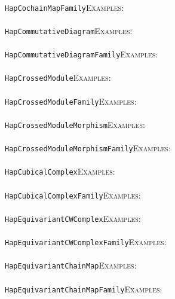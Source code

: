 \documentclass[a4paper,11pt]{report}
\begin{document}
{{ \\
 \texttt{HapCochainMapFamily}{\nobreakspace}{\nobreakspace}{\nobreakspace}{\nobreakspace}\textsc{Examples:} \\
 \\
 \texttt{HapCommutativeDiagram}{\nobreakspace}{\nobreakspace}{\nobreakspace}{\nobreakspace}\textsc{Examples:} \\
 \\
 \texttt{HapCommutativeDiagramFamily}{\nobreakspace}{\nobreakspace}{\nobreakspace}{\nobreakspace}\textsc{Examples:} \\
 \\
 \texttt{HapCrossedModule}{\nobreakspace}{\nobreakspace}{\nobreakspace}{\nobreakspace}\textsc{Examples:} \\
 \\
 \texttt{HapCrossedModuleFamily}{\nobreakspace}{\nobreakspace}{\nobreakspace}{\nobreakspace}\textsc{Examples:} \\
 \\
 \texttt{HapCrossedModuleMorphism}{\nobreakspace}{\nobreakspace}{\nobreakspace}{\nobreakspace}\textsc{Examples:} \\
 \\
 \texttt{HapCrossedModuleMorphismFamily}{\nobreakspace}{\nobreakspace}{\nobreakspace}{\nobreakspace}\textsc{Examples:} \\
 \\
 \texttt{HapCubicalComplex}{\nobreakspace}{\nobreakspace}{\nobreakspace}{\nobreakspace}\textsc{Examples:} \\
 \\
 \texttt{HapCubicalComplexFamily}{\nobreakspace}{\nobreakspace}{\nobreakspace}{\nobreakspace}\textsc{Examples:} \\
 \\
 \texttt{HapEquivariantCWComplex}{\nobreakspace}{\nobreakspace}{\nobreakspace}{\nobreakspace}\textsc{Examples:} \\
 \\
 \texttt{HapEquivariantCWComplexFamily}{\nobreakspace}{\nobreakspace}{\nobreakspace}{\nobreakspace}\textsc{Examples:} \\
 \\
 \texttt{HapEquivariantChainMap}{\nobreakspace}{\nobreakspace}{\nobreakspace}{\nobreakspace}\textsc{Examples:} \\
 \\
 \texttt{HapEquivariantChainMapFamily}{\nobreakspace}{\nobreakspace}{\nobreakspace}{\nobreakspace}\textsc{Examples:} \\
 \\
}}
\end{document}
